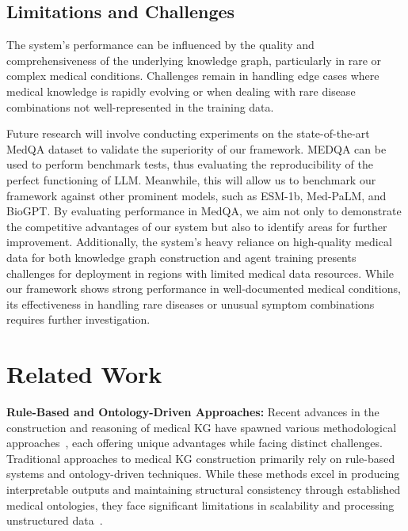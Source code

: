 \documentclass[letterpaper]{article} %
\begin{document}
\subsection{Limitations and Challenges}
The system's performance can be influenced by the quality and comprehensiveness of the underlying knowledge graph, particularly in rare or complex medical conditions. Challenges remain in handling edge cases where medical knowledge is rapidly evolving or when dealing with rare disease combinations not well-represented in the training data.

Future research will involve conducting experiments on the state-of-the-art MedQA dataset to validate the superiority of our framework. MEDQA can be used to perform benchmark tests, thus evaluating the reproducibility of the perfect functioning of LLM. Meanwhile, this will allow us to benchmark our framework against other prominent models, such as ESM-1b, Med-PaLM, and BioGPT. By evaluating performance in MedQA, we aim not only to demonstrate the competitive advantages of our system but also to identify areas for further improvement.
Additionally, the system's heavy reliance on high-quality medical data for both knowledge graph construction and agent training presents challenges for deployment in regions with limited medical data resources. While our framework shows strong performance in well-documented medical conditions, its effectiveness in handling rare diseases or unusual symptom combinations requires further investigation.

\section{Related Work}

\textbf{Rule-Based and Ontology-Driven Approaches:} 
Recent advances in the construction and reasoning of medical KG have spawned various methodological approaches~\cite{lu2024surveying,li2020real,peng2023knowledge}, each offering unique advantages while facing distinct challenges. Traditional approaches to medical KG construction primarily rely on rule-based systems and ontology-driven techniques. While these methods excel in producing interpretable outputs and maintaining structural consistency through established medical ontologies, they face significant limitations in scalability and processing unstructured data~\cite{abdulla2023}.
\end{document}
